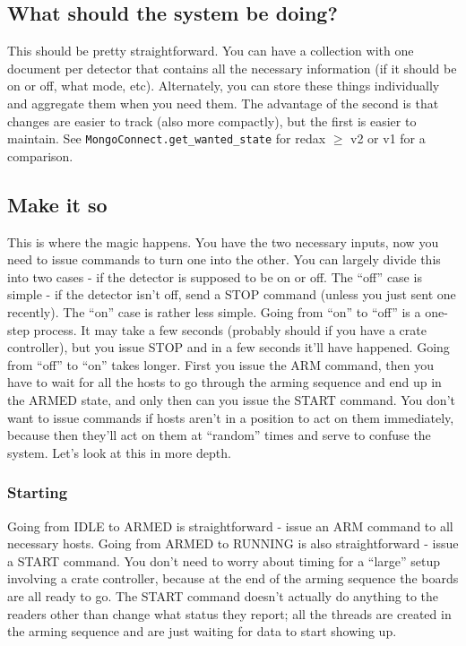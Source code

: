 \subsection{What should the system be doing?}

This should be pretty straightforward.
You can have a collection with one document per detector that contains all the necessary information (if it should be on or off, what mode, etc).
Alternately, you can store these things individually and aggregate them when you need them.
The advantage of the second is that changes are easier to track (also more compactly), but the first is easier to maintain.
See \texttt{MongoConnect.get\_wanted\_state} for redax $\geq$ v2 or v1 for a comparison.

\subsection{Make it so}

This is where the magic happens.
You have the two necessary inputs, now you need to issue commands to turn one into the other.
You can largely divide this into two cases - if the detector is supposed to be on or off.
The ``off'' case is simple - if the detector isn't off, send a STOP command (unless you just sent one recently).
The ``on'' case is rather less simple.
Going from ``on'' to ``off'' is a one-step process.
It may take a few seconds (probably should if you have a crate controller), but you issue STOP and in a few seconds it'll have happened.
Going from ``off'' to ``on'' takes longer.
First you issue the ARM command, then you have to wait for all the hosts to go through the arming sequence and end up in the ARMED state, and only then can you issue the START command.
You don't want to issue commands if hosts aren't in a position to act on them immediately, because then they'll act on them at ``random'' times and serve to confuse the system.
Let's look at this in more depth.

\subsubsection{Starting}

Going from IDLE to ARMED is straightforward - issue an ARM command to all necessary hosts.
Going from ARMED to RUNNING is also straightforward - issue a START command.
You don't need to worry about timing for a ``large'' setup involving a crate controller, because at the end of the arming sequence the boards are all ready to go.
The START command doesn't actually do anything to the readers other than change what status they report; all the threads are created in the arming sequence and are just waiting for data to start showing up.

